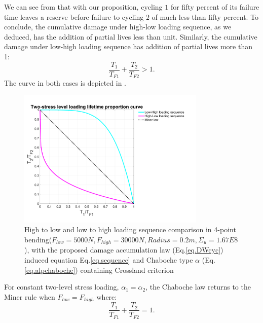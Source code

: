 We can see from  that with our proposition, cycling $1$ for fifty percent of its failure time leaves a reserve before failure to cycling $2$ of much less than fifty percent. To conclude, the cumulative damage under high-low loading sequence, as we deduced, has the addition of partial lives less than unit. Similarly, the cumulative damage under low-high loading sequence has addition of partial lives more than 1:
$$\frac{T_1}{T_{F1}}+\frac{T_2}{T_{F2}}>1.$$
The curve in both cases is depicted in .
\begin{figure}[!h]
\centering
\includegraphics[width=0.8\textwidth]{figures//sequence.png} 
\caption{High to low and low to high loading sequence comparison in 4-point bending($F_{low}=5000 N, F_{high}=30000 N, Radius=0.2m, \Sigma_u=1.67E8$), with the proposed damage accumulation law (Eq.\eqref{eq.DWcyc}) induced equation Eq.\eqref{eq.sequence} and Chaboche type $\alpha$ (Eq.\eqref{eq.alpchaboche}) containing Crossland criterion}
\label{fig.sequence}
\end{figure}
For constant two-level stress loading, $\alpha_1=\alpha_2$, the Chaboche law returns to the Miner rule when $F_{low}=F_{high}$ where:
$$\frac{T_1}{T_{F1}}+\frac{T_2}{T_{F2}}=1.$$

\newpage
